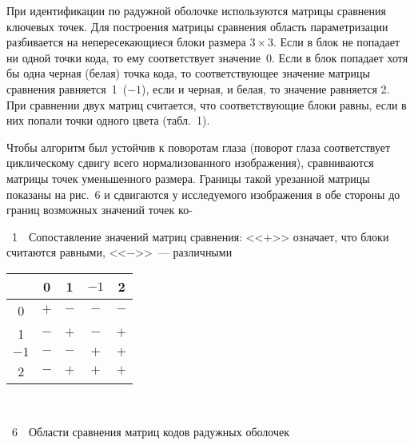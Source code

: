 \begin{multicols}{2}
При идентификации по радужной оболочке используются матрицы сравнения ключевых точек.
Для построения матрицы сравнения область пара\-мет\-ризации разбивается на непересекающиеся 
блоки размера $3\times 3$. Если в блок не попадает ни одной точки кода, то ему соответствует 
значение~0. Если в блок попадает хотя бы одна черная (белая) точка кода, то соответствующее 
значение матрицы сравнения равняется~1~($-1$), если и черная, и белая, то значение равняется 2. 
При сравнении двух матриц считается, что соответствующие блоки равны, если в них попали 
точки одного цвета (табл.~1).


Чтобы алгоритм был устойчив к поворотам глаза (поворот глаза соответствует циклическому 
сдвигу всего нормализованного изображения), сравниваются матрицы точек уменьшенного 
размера. Границы такой урезанной матрицы показаны на рис.~6 и сдвигаются у 
исследуемого изображения в обе стороны до границ возможных значений точек ко-\linebreak\vspace*{-12pt}
\columnbreak


\noindent
\begin{center}
\noindent
\parbox{51mm}{{\tablename~1}\ \ \small{Сопоставление значений матриц сравнения: <<$+$>> означает, что блоки считаются 
равными, <<$-$>>~--- различными}}
\end{center}

\begin{center}
\tabcolsep=9pt
\begin{tabular}{|c|c|c|c|c|}
\hline
&0&1&$-1$&2\\
\hline
0&$+$&$-$&$-$&$-$\\
1&$-$&$+$&$-$&$+$\\
$-1$\hphantom{$-$}&$-$&$-$&$+$&$+$\\
2&$-$&$+$&$+$&$+$\\
\hline
\end{tabular}
\end{center}
\vspace*{12pt}

\addtocounter{table}{1}

\begin{center} %
\vspace*{6pt}
\mbox{%
\epsfxsize=80mm %
}
\end{center}
{{\figurename~6}\ \ \small{Области сравнения матриц кодов радужных оболочек}}



\end{multicols}
